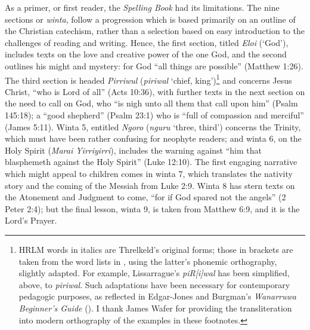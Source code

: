 {As a primer, or first reader, the \textit{Spelling Book} had its limitations. The nine sections or \textit{winta}, follow a progression which is based primarily on an outline of the Christian catechism, rather than a selection based on easy introduction to the challenges of reading and writing. Hence, the first section, titled \textit{Eloi} (‘God’), includes texts on the love and creative power of the one God, and the second outlines his might and mystery: for God “all things are possible” (Matthew 1:26). The third section is headed \textit{Pirriwul} (\textit{piriwal} ‘chief, king’)\footnote{HRLM words in italics are Threlkeld’s original forms; those in brackets are taken from the word lists in \citet[113--166]{lissarrague_salvage_2006}, using the latter’s phonemic orthography, slightly adapted. For example, Lissarrague’s \textit{piR[i]wal} has been simplified, above, to \textit{piriwal}. Such adaptations have been necessary for contemporary pedagogic purposes, as reflected in Edgar-Jones and Burgman’s \textit{Wanarruwa Beginner’s Guide} (\citeyear{edgar-jones_wanarruwa_2019}). I thank James Wafer for providing the transliteration into modern orthography of the examples in these footnotes.} and concerns Jesus Christ, “who is Lord of all” (Acts 10:36), with further texts in the next section on the need to call on God, who “is nigh unto all them that call upon him” (Psalm 145:18); a “good shepherd” (Psalm 23:1) who is “full of compassion and merciful” (James 5:11). Winta 5, entitled \textit{Ngoro} (\textit{nguru} ‘three, third’) concerns the Trinity, which must have been rather confusing for neophyte readers; and winta 6, on the Holy Spirit (\textit{Marai Yirriyirri}), includes the warning against “him that blasphemeth against the Holy Spirit” (Luke 12:10). The first engaging narrative which might appeal to children comes in winta 7, which translates the nativity story and the coming of the Messiah from Luke 2:9. Winta 8 has stern texts on the Atonement and Judgment to come, “for if God spared not the angels” (2 Peter 2:4); but the final lesson, winta 9, is taken from Matthew 6:9, and it is the Lord’s Prayer.

}
